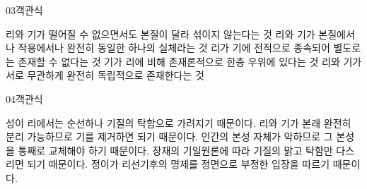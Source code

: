\documentclass[fs85,seriesWit]{korfarm-base}
\begin{document}
\begin{kfQBlock}{03}{객관식}
\begin{kfChoices}
\kfChoice 리와 기가 떨어질 수 없으면서도 본질이 달라 섞이지 않는다는 것
\kfChoice 리와 기가 본질에서나 작용에서나 완전히 동일한 하나의 실체라는 것
\kfChoice 리가 기에 전적으로 종속되어 별도로는 존재할 수 없다는 것
\kfChoice 기가 리에 비해 존재론적으로 한층 우위에 있다는 것
\kfChoice 리와 기가 서로 무관하게 완전히 독립적으로 존재한다는 것
\end{kfChoices}
\end{kfQBlock}

\begin{kfQBlock}{04}{객관식}
\begin{kfChoices}
\kfChoice 성이 리에서는 순선하나 기질의 탁함으로 가려지기 때문이다.
\kfChoice 리와 기가 본래 완전히 분리 가능하므로 기를 제거하면 되기 때문이다.
\kfChoice 인간의 본성 자체가 악하므로 그 본성을 통째로 교체해야 하기 때문이다.
\kfChoice 장재의 기일원론에 따라 기질의 맑고 탁함만 다스리면 되기 때문이다.
\kfChoice 정이가 리선기후의 명제를 정면으로 부정한 입장을 따르기 때문이다.
\end{kfChoices}
\end{kfQBlock}

\kfEndMC
\end{document}
